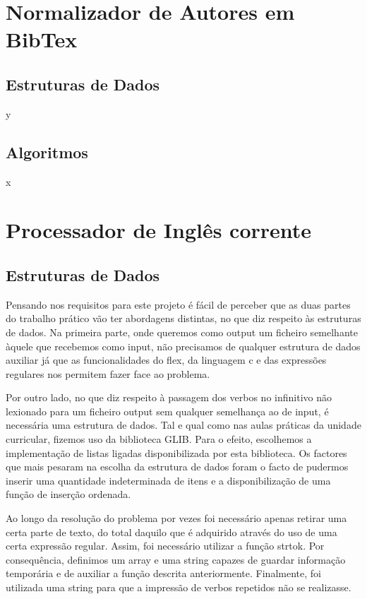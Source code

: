 \documentclass{report}
\begin{document}
\section{Normalizador de Autores em BibTex}
\subsection{Estruturas de Dados}
y
\subsection{Algoritmos}
x

\section{Processador de Inglês corrente}
\subsection{Estruturas de Dados}
Pensando nos requisitos para este projeto é fácil de perceber que as duas partes do 
trabalho prático vão ter abordagens distintas, no que diz respeito às estruturas 
de dados. Na primeira parte, onde queremos como output um ficheiro semelhante 
àquele que recebemos como input, não precisamos de qualquer estrutura de dados 
auxiliar já que as funcionalidades do flex, da linguagem c e das expressões 
regulares nos permitem fazer face ao problema.

Por outro lado, no que diz respeito à passagem dos verbos no infinitivo não 
lexionado para um ficheiro output sem qualquer semelhança ao de input, 
é necessária uma estrutura de dados. Tal e qual como nas aulas práticas 
da unidade curricular, fizemos uso da biblioteca GLIB. Para o efeito, 
escolhemos a implementação de listas ligadas disponibilizada por esta biblioteca. 
Os factores que mais pesaram na escolha da estrutura de dados foram o facto de 
pudermos inserir uma quantidade indeterminada de itens e a disponibilização 
de uma função de inserção ordenada. 

Ao longo da resolução do problema por vezes foi necessário apenas retirar 
uma certa parte de texto, do total daquilo que é adquirido através do uso 
de uma certa expressão regular. Assim, foi necessário utilizar a função 
strtok. Por consequência,  definimos um array e uma string capazes de 
guardar informação temporária e de auxiliar a função descrita anteriormente. 
Finalmente, foi utilizada uma string para que a impressão de verbos 
repetidos não se realizasse. 
\end{document}
